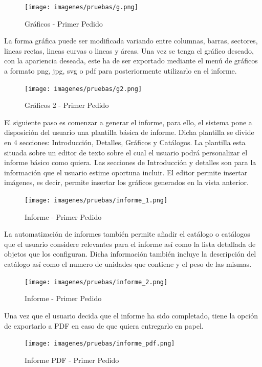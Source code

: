 \documentclass[a4paper,11pt]{book}
\begin{document}
\begin{figure}[H] 
\centering 
\texttt{[image: imagenes/pruebas/g.png]}
\caption{ Gráficos - Primer Pedido}
\end{figure}

La forma gráfica puede ser modificada variando entre columnas, barras, sectores, lineas rectas, lineas curvas o lineas y áreas. Una vez se tenga el gráfico deseado, con la apariencia deseada,  este ha de ser exportado mediante el menú de gráficos a formato png, jpg, svg o pdf para posteriormente utilizarlo en el informe. 

\begin{figure}[H] 
\centering 
\texttt{[image: imagenes/pruebas/g2.png]}
\caption{ Gráficos 2 - Primer Pedido}
\end{figure}

El siguiente paso es comenzar a generar el informe, para ello, el sistema pone a disposición del usuario una plantilla básica de informe. Dicha plantilla se divide en 4 secciones: Introducción, Detalles, Gráficos y Catálogos. La plantilla esta situada sobre un editor de texto sobre el cual el usuario podrá personalizar el informe básico como quiera. Las secciones de Introducción y detalles son para la información que el usuario estime oportuna incluir. 
El editor permite insertar imágenes, es decir, permite insertar los gráficos generados en la vista anterior.

\begin{figure}[H] 
\centering 
\texttt{[image: imagenes/pruebas/informe\_1.png]}
\caption{ Informe - Primer Pedido}
\end{figure}

La automatización de informes también permite añadir el catálogo o catálogos que el usuario considere relevantes para el informe así como la lista detallada de objetos que los configuran. Dicha información también incluye la descripción del catálogo así como el numero de unidades que contiene y el peso de las mismas.  

\begin{figure}[H] 
\centering 
\texttt{[image: imagenes/pruebas/informe\_2.png]}
\caption{ Informe - Primer Pedido}
\end{figure}

Una vez que el usuario decida que el informe ha sido completado, tiene la opción de exportarlo a PDF en caso de que quiera entregarlo en papel.
\begin{figure}[H] 
\centering 
\texttt{[image: imagenes/pruebas/informe\_pdf.png]}
\caption{ Informe PDF - Primer Pedido}
\end{figure}
\end{document}
